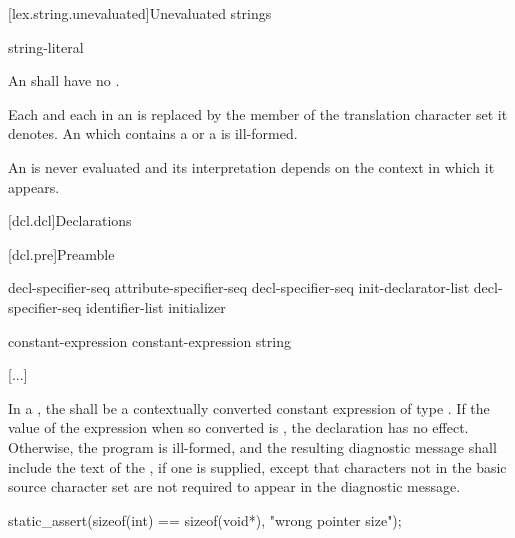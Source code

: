 \documentclass{wg21}
\begin{document}
\begin{addedblock}

[lex.string.unevaluated]{Unevaluated strings}

\begin{bnf}
    \br
    string-literal
\end{bnf}

An  shall have no  .

Each  and each  in an  is replaced by the member of the translation character set it denotes.
An  which contains a 
or a  is ill-formed.

An  is never evaluated and its interpretation depends on the context in which it appears.
\end{addedblock}



[dcl.dcl]{Declarations}%

[dcl.pre]{Preamble}

\begin{bnf}
    \br
    decl-specifier-seq  \terminal{;}\br
    attribute-specifier-seq decl-specifier-seq init-declarator-list \terminal{;}\br
     decl-specifier-seq  \terminal{[} identifier-list \terminal{]} initializer \terminal{;}
\end{bnf}

\begin{bnf}
    \br
     \terminal{(} constant-expression \terminal{)} \terminal{;}\br
     \terminal{(} constant-expression \terminal{,} string \terminal{)} \terminal{;}
\end{bnf}

[...]

\pnum
{}%
In a , the
 shall be
a contextually converted constant expression
of type .
If the value of the expression when
so converted is , the declaration has no
effect. Otherwise, the program is ill-formed, and the resulting
diagnostic message shall include the text of
the , if one is supplied,
except that characters not in the basic
source character set are not required to appear in
the diagnostic message.
\begin{example}
\begin{codeblock}
    static_assert(sizeof(int) == sizeof(void*), "wrong pointer size");
\end{codeblock}\end{example}
\end{document}
